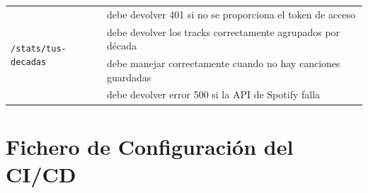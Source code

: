 \begin{longtable}{|p{5cm}|p{9cm}|}
  \multirow{4}{*}{\texttt{/stats/tus-decadas}}          & debe devolver 401 si no se proporciona el token de acceso                                \\ \cline{2-2}
                                                        & debe devolver los tracks correctamente agrupados por década                              \\ \cline{2-2}
                                                        & debe manejar correctamente cuando no hay canciones guardadas                             \\ \cline{2-2}
                                                        & debe devolver error 500 si la API de Spotify falla                                       \\ \hline
\end{longtable}

\chapter{Fichero de Configuración del CI/CD} \label{ch:anexoF}

